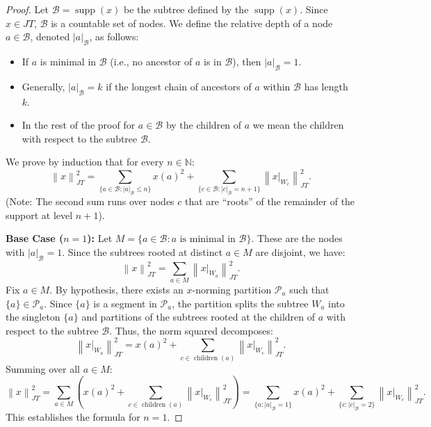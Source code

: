 \documentclass[11pt,a4paper]{amsart}
\newcommand{\JT}{JT}
\newcommand{\norm}[1]{\left\lVert#1\right\rVert}
\newcommand{\supp}{\operatorname{supp}}
\begin{document}
\begin{proof}
    Let $\mathcal{B} = \supp(x)$ be the subtree defined by the $\supp(x)$. Since $x \in \JT$, $\mathcal{B}$ is a countable set of nodes. We define the relative depth of a node $a \in \mathcal{B}$, denoted $|a|_{\mathcal{B}}$, as follows:
    \begin{itemize}
        \item If $a$ is minimal in $\mathcal{B}$ (i.e., no ancestor of $a$ is in $\mathcal{B}$), then $|a|_{\mathcal{B}}= 1$.
        \item Generally, $|a|_{\mathcal{B}} = k$ if the longest chain of ancestors of $a$ within $\mathcal{B}$ has length $k$.
        \item In the rest of the proof for $a\in \mathcal{B}$ by  the children of $a$ we mean the children with respect to the subtree $\mathcal{B}$.
    \end{itemize}
    
    We prove by induction that for every $n \in \mathbb{N}$:
    \begin{equation}\label{eq:inductive_step}
        \norm{x}_{\JT}^2 = \sum_{\{a \in \mathcal{B} : |a|_{\mathcal{B}} \le n\}} x(a)^2 + \sum_{\{ c \in \mathcal{B}: |c|_{\mathcal{B}} = n+1\}} \norm{x|_{W_c}}_{\JT}^2.
    \end{equation}
    (Note: The second sum runs over nodes $c$ that are ``roots'' of the remainder of the support at level $n+1$).

    \textbf{Base Case ($n=1$):}
    Let $M = \{ a \in \mathcal{B} : a \text{ is minimal in } \mathcal{B}\}$. These are the nodes with $|a|_{\mathcal{B}} = 1$.
    Since the subtrees rooted at distinct $a \in M$ are disjoint, we have:
    \[ \norm{x}_{\JT}^2 = \sum_{a \in M} \norm{x|_{W_a}}_{\JT}^2. \]
    Fix $a \in M$. By hypothesis, there exists an $x$-norming partition $\mathcal{P}_a$ such that $\{a\} \in \mathcal{P}_a$.
    Since $\{a\}$ is a segment in $\mathcal{P}_a$, the partition splits the subtree $W_a$ into the singleton $\{a\}$ and partitions of the subtrees rooted at the children of $a$ with respect to the subtree $ \mathcal{B} $.
    Thus, the norm squared decomposes:
    \[ \norm{x|_{W_a}}_{\JT}^2 = x(a)^2 + \sum_{c \in \operatorname{children}(a) } \norm{x|_{W_c}}_{\JT}^2. \]
    Summing over all $a \in M$:
    \[ \norm{x}_{\JT}^2 = \sum_{a \in M} \left( x(a)^2 + \sum_{c \in \operatorname{children}(a)} \norm{x|_{W_c}}_{\JT}^2 \right) = \sum_{\{a : |a|_{\mathcal{B}}=1\}} x(a)^2 + \sum_{\{c : |c|_{\mathcal{B}}=2\}} \norm{x|_{W_c}}_{\JT}^2. \]
    This establishes the formula for $n=1$.


\end{proof}
\end{document}
